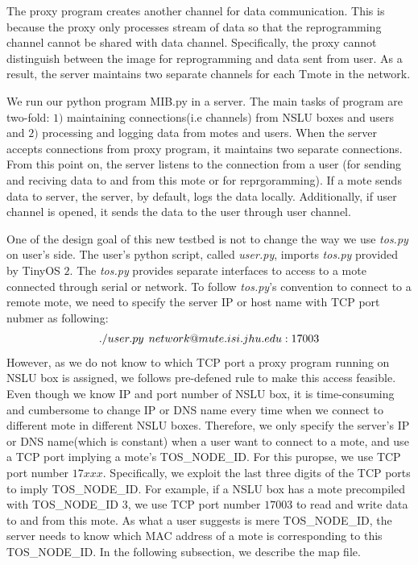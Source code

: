 \documentclass[10pt,conference]{IEEEtran}
\newcommand\spar[1]{\vspace{1ex}\noindent{\bf #1}}
\begin{document}
The proxy program creates another channel for data communication.  This is
because the proxy only processes stream of data so that the reprogramming
channel cannot be shared with data channel.  Specifically, the proxy cannot
distinguish between the image for reprogramming and data sent from user.  As a
result, the server maintains two separate channels for each Tmote in the
network.

\spar{Server running \textit{MIB.py}.} We run our python program MIB.py in a
server.  The main tasks of program are two-fold: $1)$ maintaining
connections(i.e channels) from NSLU boxes and users and $2)$ processing and
logging data from motes and users.  When the server accepts connections from
proxy program, it maintains two separate connections.  From this point on, the
server listens to the connection from a user (for sending and reciving data to
and from this mote or for reprgoramming).  If a mote sends data to server, the
server, by default, logs the data locally.  Additionally, if user channel is
opened, it sends the data to the user through user channel.

\spar{PC running \textit{user.py}.} One of the design goal of this new testbed
is not to change the way we use \textit{tos.py} on user's side.  The user's
python script, called \textit{user.py}, imports \textit{tos.py} provided by
TinyOS $2$.  The \textit{tos.py} provides separate interfaces to access to a
mote connected through serial or network.  To follow \textit{tos.py}'s
convention to connect to a remote mote, we need to specify the server IP or
host name with TCP port nubmer as following:
\begin{equation}
\label{eqn:mute}
\small
./user.py \hspace{1.5mm} network@mute.isi.jhu.edu:17003
\end{equation}
However, as we do not know to which TCP port a proxy program running on NSLU
box is assigned, we follows pre-defened rule to make this access feasible.
Even though we know IP and port number of NSLU box, it is time-consuming and
cumbersome to change IP or DNS name every time when we connect to different
mote in different NSLU boxes.  Therefore, we only specify the server's IP or
DNS name(which is constant) when a user want to connect to a mote, and use a
TCP port implying a mote's TOS\_NODE\_ID.  For this puropse, we use TCP port
number $17xxx$.  Specifically, we exploit the last three digits of the TCP
ports to imply TOS\_NODE\_ID.  For example, if a NSLU box has a mote
precompiled with TOS\_NODE\_ID $3$, we use TCP port number $17003$ to read and
write data to and from this mote.  As what a user suggests is mere
TOS\_NODE\_ID, the server needs to know which MAC address of a mote is
corresponding to this TOS\_NODE\_ID.  In the following subsection, we describe
the map file.
\end{document}
